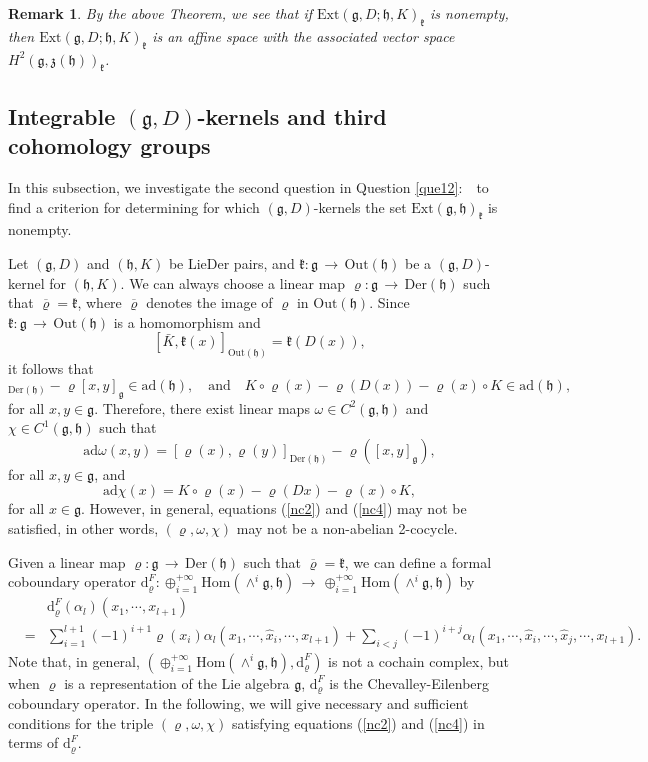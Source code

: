 \documentclass[12pt]{amsart}
\newtheorem{rmk}[thm]{Remark}
\newcommand{\lon }{\,\rightarrow\,}
\newcommand{\g}{\mathfrak g}
\newcommand{\h}{\mathfrak h}
\newcommand{\frkk}{\mathfrak k}
\newcommand{\frkz}{\mathfrak z}
\newcommand{\dM}{\mathrm{d}}
\newcommand{\Hom}{\mathrm{Hom}}
\newcommand{\LD}{{\rm LieDer }}
\newcommand{\Der}{\mathrm{Der}}
\newcommand{\Out}{\mathrm{Out}}
\newcommand{\ad}{\mathrm{ad}}
\begin{document}
\begin{rmk}
    By the above Theorem, we see that if $\mathrm{Ext}(\g,D;\h,K)_{\frkk}$ is nonempty, then $\mathrm{Ext}(\g,D;\h,K)_{\frkk}$ is an affine space with the associated vector space $H^2(\g,\frkz(\h))_{\frkk}$.
\end{rmk}

\subsection{Integrable $(\g, D)$-kernels and third cohomology groups} In this subsection, we investigate the second question in Question \ref{que12}:~~to find a criterion for determining for which $(\g,D)$-kernels the set $\mathrm{Ext}(\g,\h)_{\frkk}$ is nonempty. 

Let $(\g, D)$ and $(\h, K)$ be \LD pairs, and $\frkk:\g\lon\Out(\h)$ be a $(\g,D)$-kernel for $(\h,K)$. We can always choose a linear map $\varrho:\g\lon\Der(\h)$ such that $\overline{\varrho}=\frkk$, where $\overline{\varrho}$ denotes the image of $\varrho$ in $\Out(\h)$. Since $\frkk:\g\lon\Out(\h)$ is a homomorphism and
$$
[\bar{K}, \frkk(x)]_{\Out(\h)}=\frkk(D(x)),
$$
it follows that 
\begin{equation*}
    [\varrho(x),\varrho(y)]_{\Der(\h)}-\varrho[x,y]_{\g}\in \ad(\h),\quad\text{and}\quad
    K\circ\varrho(x)-\varrho(D(x))-\varrho(x)\circ K\in \ad(\h),
\end{equation*}
for all $x, y\in\g$. Therefore, there exist linear maps $\omega\in C^2(\g,\h)$ and $\chi\in C^1(\g,\h)$  such that
\begin{equation}\label{1defiomega}
    \ad \omega(x,y)=[\varrho(x),\varrho(y)]_{\Der(\h)}-\varrho([x,y]_{\g}),
\end{equation}
for all $x,y\in\g$, and 
\begin{equation}\label{1defichi}
    \ad\chi(x)=K\circ\varrho(x)-\varrho(Dx)-\varrho(x)\circ K,
\end{equation}
for all $x\in\g$. However, in general, equations (\ref{nc2}) and (\ref{nc4}) may not be satisfied, in other words, $(\varrho,\omega,\chi)$ may not be a non-abelian 2-cocycle.

Given a linear map $\varrho:\g\lon\Der(\h)$ such that $\overline{\varrho}=\frkk$, we can define a formal coboundary operator $\dM^F_{\varrho}:\oplus_{i=1}^{+\infty}\Hom(\wedge^{i}{\g},\h)\lon\oplus_{i=1}^{+\infty}\Hom(\wedge^{i}{\g},\h)$ by
\begin{eqnarray*}\label{formald}
&&\dM^F_{\varrho}(\alpha_l)(x_1, \cdots, x_{l+1})\\
\nonumber&=&\sum_{i=1}^{l+1}(-1)^{i+1}\varrho(x_i)\alpha_l(x_1, \cdots, \hat{x}_i, \cdots, x_{l+1})+\sum_{i<j}(-1)^{i+j}\alpha_l(x_1, \cdots,\hat{x}_i, \cdots, \hat{x}_j, \cdots, x_{l+1}).
\end{eqnarray*}
Note that, in general, $(\oplus_{i=1}^{+\infty}\Hom(\wedge^{i}{\g},\h),\dM^F_{\varrho})$ is not a cochain complex, but when $\varrho$ is a representation of the Lie algebra $\g$,  $\dM^F_\varrho$ is the Chevalley-Eilenberg coboundary operator.
In the following, we will give necessary and sufficient conditions for the triple $(\varrho,\omega,\chi)$ satisfying equations (\ref{nc2}) and (\ref{nc4}) in terms of $\dM^F_\varrho$.
\end{document}
